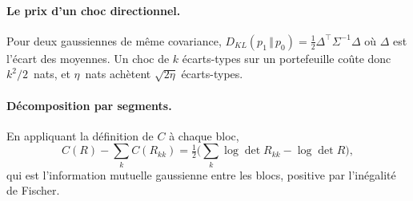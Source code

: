 \documentclass[11pt]{article}
\theoremstyle{definition}
\newcommand{\KL}[2]{D_{KL}\!\left(#1\,\Vert\,#2\right)}
\begin{document}
\paragraph{Le prix d'un choc directionnel.} Pour deux gaussiennes de même
covariance, $\KL{p_1}{p_0}=\tfrac12\Delta^\top\Sigma^{-1}\Delta$ où $\Delta$
est l'écart des moyennes. Un choc de $k$ écarts-types sur un portefeuille coûte
donc $k^2/2$~nats, et $\eta$~nats achètent $\sqrt{2\eta}$ écarts-types.

\paragraph{Décomposition par segments.} En appliquant la définition de $C$ à
chaque bloc,
\[C(R)-\textstyle\sum_kC(R_{kk})=\tfrac12\bigl(\sum_k\log\det R_{kk}-\log\det R\bigr),\]
qui est l'information mutuelle gaussienne entre les blocs, positive
par l'inégalité de Fischer.
\end{document}
